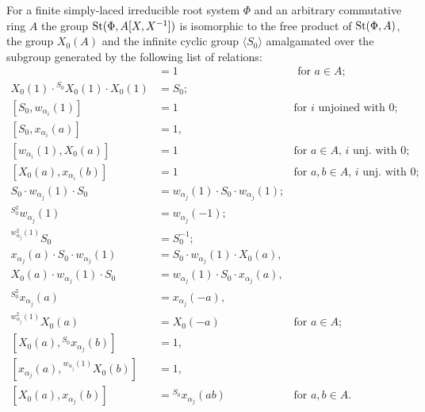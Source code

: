 \begin{prop} \label{prop:Allcock-affine} For a finite simply-laced irreducible root system $\Phi$ and an arbitrary commutative ring $A$
 the group $\operatorname{St}(\Phi, A[X, X^{-1}])$ is isomorphic to the free product of $\operatorname{St}(\Phi, A)$, the group $X_0(A)$ and the infinite cyclic group $\langle S_0 \rangle$
     amalgamated over the subgroup generated by the following list of relations:
    {\allowdisplaybreaks\begin{align}
        [S_0^2, X_0(a)] & = 1 & \text{ for $a \in A$; } \label{eq:Allcock-2} \\
        X_0(1) \cdot {}^{S_0} X_0(1) \cdot X_0(1) & = S_0; \label{eq:Allcock-3} \\
        [S_0, w_{\alpha_i}(1)] & = 1 &  \text{for $i$ unjoined with $0$;} \label{eq:Allcock-4} \\
        [S_0, x_{\alpha_i}(a)] & = 1, &  \label{eq:Allcock-5-1}\\
        [w_{\alpha_i}(1), X_0(a)] & = 1 & \text{for $a \in A$, $i$ unj. with $0$;} \label{eq:Allcock-5-2} \\
        [X_0(a), x_{\alpha_i}(b)] & = 1 & \text{for $a, b \in A$, $i$ unj. with $0$;} \label{eq:Allcock-6} \\
        S_0 \cdot w_{\alpha_j}(1) \cdot S_0 & = w_{\alpha_j}(1) \cdot S_0 \cdot w_{\alpha_j}(1); \label{eq:Allcock-7} \\
        {}^{S_0^2} w_{\alpha_j}(1) & = w_{\alpha_j}(-1); \label{eq:Allcock-8-1} \\
        {}^{w_{\alpha_j}^2(1)} S_0 & = S_0^{-1}; \label{eq:Allcock-8-2} \\
        x_{\alpha_j}(a) \cdot S_0 \cdot w_{\alpha_j}(1) & = S_0 \cdot w_{\alpha_j}(1) \cdot X_0(a), & \label{eq:Allcock-9-1} \\
        X_0(a) \cdot w_{\alpha_j}(1) \cdot S_0 & = w_{\alpha_j}(1) \cdot S_0 \cdot x_{\alpha_j}(a), & \label{eq:Allcock-9-2} \\
        {}^{S_0^2} x_{\alpha_j}(a) & = x_{\alpha_j}(-a), & \label{eq:Allcock-10-1} \\
        {}^{w_{\alpha_j}^2(1)} X_0(a) & = X_0(-a) & \text{for $a \in A;$} \label{eq:Allcock-10-2} \\
        [X_0(a), {}^{S_0} x_{\alpha_j}(b)] &= 1, & \label{eq:Allcock-11-1} \\
        [x_{\alpha_j}(a), {}^{w_{\alpha_j}(1)}X_0(b)] &= 1, & \label{eq:Allcock-11-2} \\
        [X_0(a), x_{\alpha_j}(b)] &= {}^{S_0} x_{\alpha_j}(ab) & \text{for $a, b \in A.$} \label{eq:Allcock-12}
    \end{align}}
\end{prop}
